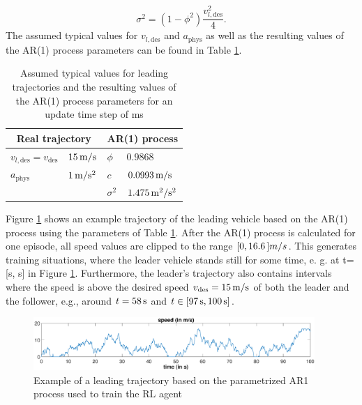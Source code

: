 \documentclass[review]{elsarticle}
\providecommand{\martin}[1]{#1}                  %
\providecommand{\sub}[1]{_{\mathrm{#1}}}  %
\providecommand{\3}{{\ss}}
\begin{document}
\begin{equation}
\sigma^2=(1-\phi^2)\frac{v_{l,\text{des}}^2}{4}.
\end{equation}
The assumed typical values for $v_{l,\text{des}}$ and  $a\sub{phys}$ as well as the resulting values of the AR(1) process parameters can be found in Table \ref{tab:AR1Parameters}.
%
\begin{table}
	\caption{Assumed typical values for leading trajectories and
		the resulting values of the AR(1) process parameters for an
		update time step of \unit[100]{ms}} 
	\label{tab:AR1Parameters} 
	\begin{center}
		\begin{tabular}{ p{} p{} |p{} p{}  }
			\multicolumn{2}{c|}{Real trajectory} & \multicolumn{2}{c}{AR(1) process}   \\ \hline
			$v_{l,\text{des}}\martin{=v\sub{des}}$ &$\unit[15]{m/s}$ &$\phi$ & $0.9868$\\
			$a\sub{phys}$ &$\unit[1]{m/s^2}$ &$c$ & $\unit[0.0993]{m/s}$\\
			& & $\sigma^2$ & $\unit[1.475]{m^2/s^2}$
			
		\end{tabular}
	\end{center}
\end{table}
%
Figure \ref{fig:AR1process} shows an example trajectory of the leading
vehicle based on the AR(1) process using the parameters of Table
\ref{tab:AR1Parameters}. After the AR(1) process is calculated for one
episode, all speed values are clipped to the range $\unit[[0, 16.6]]{m/s}$. This generates
training situations, where the leader vehicle stands still for some
time, e. g. at t= [\unit[48]{s}, \unit[50]{s}] in Figure
\ref{fig:AR1process}. Furthermore, the leader's trajectory
  also contains intervals where the speed is above the desired speed
  $v\sub{des}=\unit[15]{m/s}$ of both the leader and the follower,
  e.g., around $t=\unit[58]{s}$ and $t\in [\unit[97]{s},
    \unit[100]{s}]$.
  
\begin{figure}
	\centering
	\includegraphics[width=0.95\textwidth]{images/AR1process}
	\caption{Example of a leading trajectory based on the parametrized AR1 process used to train the RL agent}
	\label{fig:AR1process}
\end{figure}
%
%
%
\end{document}
